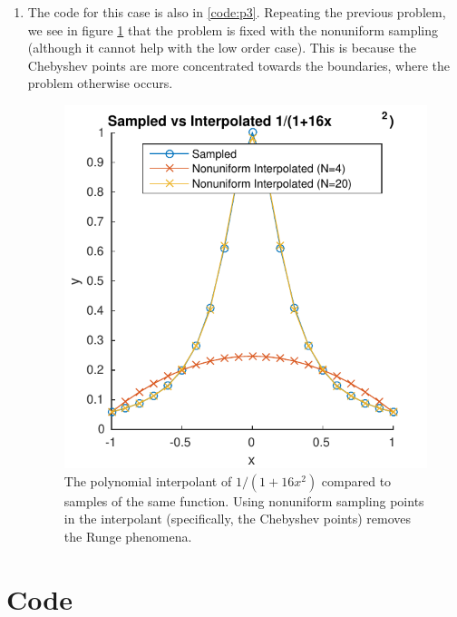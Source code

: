 \documentclass{article}
\begin{document}
\begin{enumerate}
\item
The code for this case is also in \ref{code:p3}.
Repeating the previous problem, we see in figure \ref{fig:p3n20c} that the problem is fixed with the nonuniform sampling (although it cannot help with the low order case).
This is because the Chebyshev points are more concentrated towards the boundaries, where the problem otherwise occurs.
\begin{figure}[!ht]
\centering
\includegraphics[scale=1]{p3n20c.pdf}
\caption{The polynomial interpolant of $1 / (1+16x^2)$ compared to samples of the same function. Using nonuniform sampling points in the interpolant (specifically, the Chebyshev points) removes the Runge phenomena.}
\label{fig:p3n20c}
\end{figure}

\end{enumerate}

\clearpage
\appendix
\section{Code}





\end{document}
